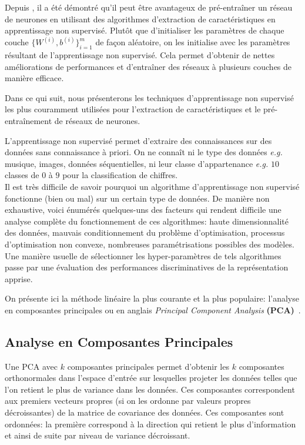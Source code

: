 Depuis \citep{Hinton06,Bengio-nips-2006}, il a été démontré qu'il peut être
avantageux de pré-entraîner un réseau de neurones en utilisant des algorithmes
d'extraction de caractéristiques en apprentissage non supervisé. Plutôt que
d'initialiser les paramètres de chaque couche $\lbrace W^{(i)},b^{(i)} \rbrace_{i=1}^{m}$ de façon
aléatoire, on les initialise avec les paramètres résultant de l'apprentissage
non supervisé.  Cela permet d'obtenir de nettes améliorations de performances
et d'entraîner des réseaux à plusieurs couches de manière efficace.

Dans ce qui suit, nous présenterons les techniques d'apprentissage non
supervisé les plus couramment utilisées pour l'extraction de caractéristiques
et le pré-entraînement de réseaux de neurones.

L'apprentissage non supervisé permet d'extraire des connaissances sur des
données sans connaissance à priori. On ne connaît ni le type des données
\textit{e.g.} musique, images, données séquentielles, ni leur classe
d'appartenance \textit{e.g.} $10$ classes de $0$ à $9$ pour la classification
de chiffres.  \\

Il est très difficile de savoir pourquoi un algorithme d'apprentissage non
supervisé fonctionne (bien ou mal) sur un certain type de données.  De manière
non exhaustive, voici énumérés quelques-uns des facteurs qui rendent difficile
une analyse complète du fonctionnement de ces algorithmes: haute
dimensionnalité des données, mauvais conditionnement du problème
d'optimisation, processus d'optimisation non convexe, nombreuses
paramétrisations possibles des modèles. \\

Une manière usuelle de sélectionner les hyper-paramètres de tels algorithmes passe 
par une évaluation des performances discriminatives de la
représentation apprise.

On présente ici la méthode linéaire la plus courante et la plus populaire:
l'analyse en composantes principales ou en anglais \textit{Principal Component
Analysis} \textbf{(PCA)}~\citep{Pearson-1901,Hotelling1933}.

\subsection{Analyse en Composantes Principales} \label{sec:pca}

Une PCA avec $k$ composantes principales permet d'obtenir les $k$ composantes
orthonormales dans l'espace d'entrée sur lesquelles projeter les données telles
que l'on retient le plus de variance dans les données. Ces composantes
correspondent aux premiers vecteurs propres (si on les ordonne par valeurs
propres décroissantes) de la matrice de covariance des données.  Ces
composantes sont ordonnées: la première correspond à la direction qui retient
le plus d'information et ainsi de suite par niveau de variance décroissant.

